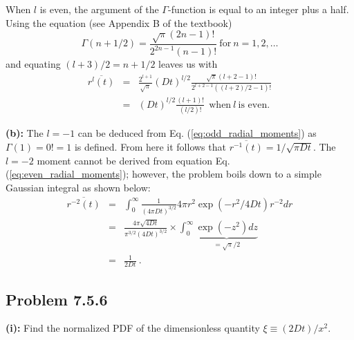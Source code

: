 When $l$ is even, the argument of the $\Gamma$-function is equal to an integer plus a half. Using the equation (see Appendix B of the textbook)
\begin{equation}
\Gamma(n+1/2) = \frac{\sqrt{\pi} (2n-1)!}{2^{2n-1}(n-1)!}~\text{for}~n = 1, 2, \ldots \nonumber
\end{equation}
and equating $(l+3)/2 = n + 1/2$ leaves us with
\begin{eqnarray}
\overline{r^l(t)} &=& \frac{2^{l+1}}{\sqrt{\pi}} (D t)^{l/2} \frac{\sqrt{\pi} (l+2-1)!}{2^{l+2-1}((l+2)/2-1)!} \nonumber \\
&=& \boxed{(D t)^{l/2} \frac{(l+1)!}{(l/2)!} ~~\text{when}~l~\text{is even.}} \label{eq:even_radial_moments}
\end{eqnarray}

\textbf{(b):} The $l=-1$ can be deduced from Eq. (\ref{eq:odd_radial_moments}) as $\Gamma(1) = 0! = 1$ is defined. From here it follows that $\overline{r^{-1}(t)} = 1/\sqrt{\pi Dt}$. The $l=-2$ moment cannot be derived from equation Eq. (\ref{eq:even_radial_moments}); however, the problem boils down to a simple Gaussian integral as shown below:
\begin{eqnarray}
\overline{r^{-2}(t)} &=& \int_{0}^{\infty} \frac{1}{(4 \pi D t)^{3/2}} 4 \pi r^2 \exp(-r^2/4Dt) r^{-2} dr \nonumber \\
&=& \frac{4 \pi \sqrt{4Dt}}{\pi^{3/2} (4Dt)^{3/2}} \times \int_{0}^{\infty} \underbrace{\exp(-z^2) dz}_{=\sqrt{\pi}/2} \nonumber \\
&=& \boxed{\frac{1}{2Dt}}~.
\end{eqnarray}


\subsection{Problem 7.5.6}
\textbf{(i):} Find the normalized PDF of the dimensionless quantity $\xi \equiv (2Dt)/x^2$. 

